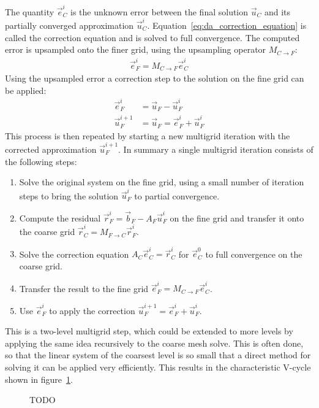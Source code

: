 The quantity $\vec{e}_C^i$ is the unknown error between the final solution $\vec{u}_C$ and its partially converged approximation $\vec{u}_C^i$. Equation~\ref{eq:da_correction_equation} is called the correction equation and is solved to full convergence. The computed error is upsampled onto the finer grid, using the upsampling operator $M_{C\rightarrow F}$:
\begin{align}
\vec{e}_F^i = M_{C\rightarrow F}\vec{e}_C^i
\nonumber
\end{align}
Using the upsampled error a correction step to the solution on the fine grid can be applied:
\begin{align}
\vec{e}_F^i &= \vec{u}_F - \vec{u}_F^i
\nonumber
\\
\vec{u}_F^{i+1} &= \vec{u}_F = \vec{e}_F^i + \vec{u}_F^i
\nonumber
\end{align}
This process is then repeated by starting a new multigrid iteration with the corrected approximation $\vec{u}_F^{i+1}$. In summary a single multigrid iteration consists of the following steps:
\begin{enumerate}
\item Solve the original system on the fine grid, using a small number of iteration steps to bring the solution $\vec{u}_F^i$ to partial convergence.
\item Compute the residual $\vec{r}_F^i=\vec{b}_F - A_F\vec{u}_F^i$ on the fine grid and transfer it onto the coarse grid $\vec{r}_C^i = M_{F\rightarrow C}\vec{r}_F^i$.
\item Solve the correction equation $A_C\vec{e}_C^i = \vec{r}_C^i$ for $\vec{e}_C^0$ to full convergence on the coarse grid.
\item Transfer the result to the fine grid $\vec{e}_F^i = M_{C\rightarrow F}\vec{e}_C^i$.
\item Use $\vec{e}_F^i$ to apply the correction $\vec{u}_F^{i+1} =  \vec{e}_F^i + \vec{u}_F^i$.
\end{enumerate}
This is a two-level multigrid step, which could be extended to more levels by applying the same idea recursively to the coarse mesh solve. This is often done, so that the linear system of the coarsest level is so small that a direct method for solving it can be applied very efficiently. This results in the characteristic V-cycle shown in figure~\ref{fig:da_solver_multigrid_vcycles}.
\begin{figure}[h]
\centering
{}
\caption{TODO}
\label{fig:da_solver_multigrid_vcycles}
\end{figure}

